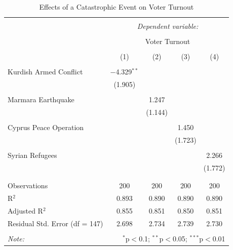 \documentclass[12pt]{article}
\begin{document}
\begin{table}[!htbp] \centering 
  \caption{Effects of a Catastrophic Event on Voter Turnout} 
  \label{} 
\begin{tabular}{@{\extracolsep{5pt}}lcccc} 
\\[-1.8ex]\hline 
\hline \\[-1.8ex] 
 & \multicolumn{4}{c}{\textit{Dependent variable:}} \\ 
\cline{2-5} 
\\[-1.8ex] & \multicolumn{4}{c}{Voter Turnout} \\ 
\\[-1.8ex] & (1) & (2) & (3) & (4)\\ 
\hline \\[-1.8ex] 
 Kurdish Armed Conflict & $-$4.329$^{**}$ &  &  &  \\ 
  & (1.905) &  &  &  \\ 
  & & & & \\ 
 Marmara Earthquake &  & 1.247 &  &  \\ 
  &  & (1.144) &  &  \\ 
  & & & & \\ 
 Cyprus Peace Operation &  &  & 1.450 &  \\ 
  &  &  & (1.723) &  \\ 
  & & & & \\ 
 Syrian Refugees &  &  &  & 2.266 \\ 
  &  &  &  & (1.772) \\ 
  & & & & \\ 
\hline \\[-1.8ex] 
Observations & 200 & 200 & 200 & 200 \\ 
R$^{2}$ & 0.893 & 0.890 & 0.890 & 0.890 \\ 
Adjusted R$^{2}$ & 0.855 & 0.851 & 0.850 & 0.851 \\ 
Residual Std. Error (df = 147) & 2.698 & 2.734 & 2.739 & 2.730 \\ 
\hline 
\hline \\[-1.8ex] 
\textit{Note:}  & \multicolumn{4}{r}{$^{*}$p$<$0.1; $^{**}$p$<$0.05; $^{***}$p$<$0.01} \\ 
\end{tabular} 
\end{table} 
\end{document}
